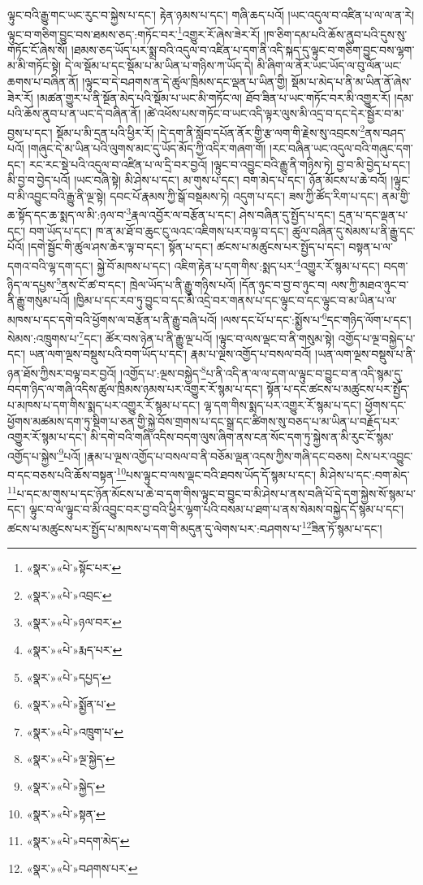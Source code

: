 ལྟུང་བའི་རྒྱུ་གང་ཡང་རུང་བ་སྐྱེས་པ་དང་། རྟེན་ཉམས་པ་དང་། གཞི་ཆད་པའོ། །ཡང་འདུལ་བ་འཛིན་པ་ལ་ལ་ན་རེ། ལྟུང་བ་གཅིག་བྱུང་བས་ཐམས་ཅད་:གཏོང་བར་\footnote{«སྣར་»«པེ་»སྟོང་པར་}འགྱུར་རོ་ཞེས་ཟེར་རོ། །ཁ་ཅིག་དམ་པའི་ཆོས་ནུབ་པའི་དུས་སུ་གཏོང་ངོ་ཞེས་སོ། །ཐམས་ཅད་ཡོད་པར་སྨྲ་བའི་འདུལ་བ་འཛིན་པ་དག་ནི་འདི་སྐད་དུ་ལྟུང་བ་གཅིག་བྱུང་བས་ལྷག་མ་མི་གཏོང་སྟེ། དེ་ལ་སྡོམ་པ་དང་སྡོམ་པ་མ་ཡིན་པ་གཉིས་ཀ་ཡོད་དེ། མི་ཞིག་ལ་ནོར་ཡང་ཡོད་ལ་བུ་ལོན་ཡང་ཆགས་པ་བཞིན་ནོ། །ལྟུང་བ་དེ་བཤགས་ན་དེ་ཚུལ་ཁྲིམས་དང་ལྡན་པ་ཡིན་གྱི། སྡོམ་པ་མེད་པ་ནི་མ་ཡིན་ནོ་ཞེས་ཟེར་རོ། །མཚན་གྱུར་པ་ནི་སྔོན་མེད་པའི་སྡོམ་པ་ཡང་མི་གཏོང་ལ། ཐོབ་ཟིན་པ་ཡང་གཏོང་བར་མི་འགྱུར་རོ། །དམ་པའི་ཆོས་ནུབ་པ་ན་ཡང་དེ་བཞིན་ནོ། །ཚེ་འཕོས་པས་གཏོང་བ་ཡང་འདི་ལྟར་ལུས་མི་འདྲ་བ་དང་དེར་སྦྱོར་བ་མ་བྱས་པ་དང་། སྡོམ་པ་མི་དྲན་པའི་ཕྱིར་རོ། །དེ་དག་ནི་སློབ་དཔོན་ནོར་གྱི་རྩ་ལག་གི་རྗེས་སུ་འབྲངས་\footnote{«སྣར་»«པེ་»འབྲང་}ནས་བཤད་པའོ། །གཞུང་དེ་མ་ཡིན་པའི་ལུགས་མང་དུ་ཡོད་མོད་ཀྱི་འདིར་གཞག་གོ། །རང་བཞིན་ཡང་འདུལ་བའི་གཞུང་དག་དང་། རང་རང་སྡེ་པའི་འདུལ་བ་འཛིན་པ་ལ་དྲི་བར་བྱའོ། །ལྟུང་བ་འབྱུང་བའི་རྒྱུ་ནི་གཉིས་ཏེ། བྱ་བ་མི་བྱེད་པ་དང་། མི་བྱ་བ་བྱེད་པའོ། །ཡང་བཞི་སྟེ། མི་ཤེས་པ་དང་། མ་གུས་པ་དང་། བག་མེད་པ་དང་། ཉོན་མོངས་པ་ཆེ་བའོ། །ལྟུང་བ་མི་འབྱུང་བའི་རྒྱུ་ནི་ལྔ་སྟེ། དབང་པོ་རྣམས་ཀྱི་སྒོ་བསྡམས་ཏེ། འདུག་པ་དང་། ཟས་ཀྱི་ཚོད་རིག་པ་དང་། ནམ་གྱི་ཆ་སྟོད་དང་ཆ་སྨད་ལ་མི་:ཉལ་བ་\footnote{«སྣར་»«པེ་»ཉལ་བར་}རྣལ་འབྱོར་ལ་བརྩོན་པ་དང་། ཤེས་བཞིན་དུ་སྤྱོད་པ་དང་། དྲན་པ་དང་ལྡན་པ་དང་། བག་ཡོད་པ་དང་། ཁ་ན་མ་ཐོ་བ་ཆུང་ངུ་ལའང་འཇིགས་པར་བལྟ་བ་དང་། ཚུལ་བཞིན་དུ་སེམས་པ་ནི་རྒྱུ་དང་པོའོ། །དགེ་སྦྱོང་གི་ཚུལ་ཤས་ཆེར་ལྟ་བ་དང་། སྟོན་པ་དང་། ཚངས་པ་མཚུངས་པར་སྤྱོད་པ་དང་། བསྟན་པ་ལ་དགའ་བའི་ལྷ་དག་དང་། སྐྱེ་བོ་མཁས་པ་དང་། འཇིག་རྟེན་པ་དག་གིས་:སྨད་པར་\footnote{«སྣར་»«པེ་»རྨད་པར་}འགྱུར་རོ་སྙམ་པ་དང་། བདག་ཉིད་ལ་དཔྱས་\footnote{«སྣར་»«པེ་»དཔྱད་}ནས་ངོ་ཚ་བ་དང་། ཁྲེལ་ཡོད་པ་ནི་རྒྱུ་གཉིས་པའོ། །དོན་ཉུང་བ་བྱ་བ་ཉུང་བ། ལས་ཀྱི་མཐའ་ཉུང་བ་ནི་རྒྱུ་གསུམ་པའོ། །ཁྱིམ་པ་དང་རབ་ཏུ་བྱུང་བ་དང་མི་འདྲེ་བར་གནས་པ་དང་ལྟུང་བ་དང་ལྟུང་བ་མ་ཡིན་པ་ལ་མཁས་པ་དང་དགེ་བའི་ཕྱོགས་ལ་བརྩོན་པ་ནི་རྒྱུ་བཞི་པའོ། །ལས་དང་པོ་པ་དང་:སྨྱོས་པ་\footnote{«སྣར་»«པེ་»སྨྱོན་པ་}དང་གཉིད་ལོག་པ་དང་། སེམས་:འཁྲུགས་པ་\footnote{«སྣར་»«པེ་»འཁྲུག་པ་}དང་། ཚོར་བས་ཉེན་པ་ནི་རྒྱུ་ལྔ་པའོ། །ལྟུང་བ་ལས་ལྡང་བ་ནི་གསུམ་སྟེ། འགྱོད་པ་ལྔ་བསྐྱེད་པ་དང་། ཡན་ལག་ལྔས་བསྡུས་པའི་བག་ཡོད་པ་དང་། རྣམ་པ་ལྔས་འགྱོད་པ་བསལ་བའོ། །ཡན་ལག་ལྔས་བསྡུས་པ་ནི་ཉན་ཐོས་ཀྱིསར་བལྟ་བར་བྱའོ། །འགྱོད་པ་:ལྔས་བསྐྱེད་\footnote{«སྣར་»«པེ་»ལྔ་སྐྱེད་}པ་ནི་འདི་ན་ལ་ལ་དག་ལ་ལྟུང་བ་བྱུང་བ་ན་འདི་སྙམ་དུ་བདག་ཉིད་ལ་གཞི་འདིས་ཚུལ་ཁྲིམས་ཉམས་པར་འགྱུར་རོ་སྙམ་པ་དང་། སྟོན་པ་དང་ཚངས་པ་མཚུངས་པར་སྤྱོད་པ་མཁས་པ་དག་གིས་སྨད་པར་འགྱུར་རོ་སྙམ་པ་དང་། ལྷ་དག་གིས་སྨད་པར་འགྱུར་རོ་སྙམ་པ་དང་། ཕྱོགས་དང་ཕྱོགས་མཚམས་དག་ཏུ་སྡིག་པ་ཅན་གྱི་སྐྱེ་བོས་གྲགས་པ་དང་སྒྲ་དང་ཚིགས་སུ་བཅད་པ་མ་ཡིན་པ་བརྗོད་པར་འགྱུར་རོ་སྙམ་པ་དང་། མི་དགེ་བའི་གཞི་འདིས་བདག་ལུས་ཞིག་ནས་ངན་སོང་དག་ཏུ་སྐྱེས་ན་མི་རུང་ངོ་སྙམ་འགྱོད་པ་སྐྱེས་\footnote{«སྣར་»«པེ་»སྐྱེད་}པའོ། །རྣམ་པ་ལྔས་འགྱོད་པ་བསལ་བ་ནི་བཅོམ་ལྡན་འདས་ཀྱིས་གཞི་དང་བཅས། ངེས་པར་འབྱུང་བ་དང་བཅས་པའི་ཆོས་བསྟན་\footnote{«སྣར་»«པེ་»སྟན་}པས་ལྟུང་བ་ལས་ལྡང་བའི་ཐབས་ཡོད་དོ་སྙམ་པ་དང་། མི་ཤེས་པ་དང་:བག་མེད་\footnote{«སྣར་»«པེ་»བདག་མེད་}པ་དང་མ་གུས་པ་དང་ཉོན་མོངས་པ་ཆེ་བ་དག་གིས་ལྟུང་བ་བྱུང་བ་མི་ཤེས་པ་ནས་བཞི་པོ་དེ་དག་སྐྱེས་སོ་སྙམ་པ་དང་། ལྟུང་བ་ལ་ལྟུང་བ་མི་འབྱུང་བར་བྱ་བའི་ཕྱིར་ལྷག་པའི་བསམ་པ་ཐག་པ་ནས་སེམས་བསྐྱེད་དོ་སྙམ་པ་དང་། ཚངས་པ་མཚུངས་པར་སྤྱོད་པ་མཁས་པ་དག་གི་མདུན་དུ་ལེགས་པར་:བཤགས་པ་\footnote{«སྣར་»«པེ་»བཤགས་པར་}ཟིན་ཏོ་སྙམ་པ་དང་། 